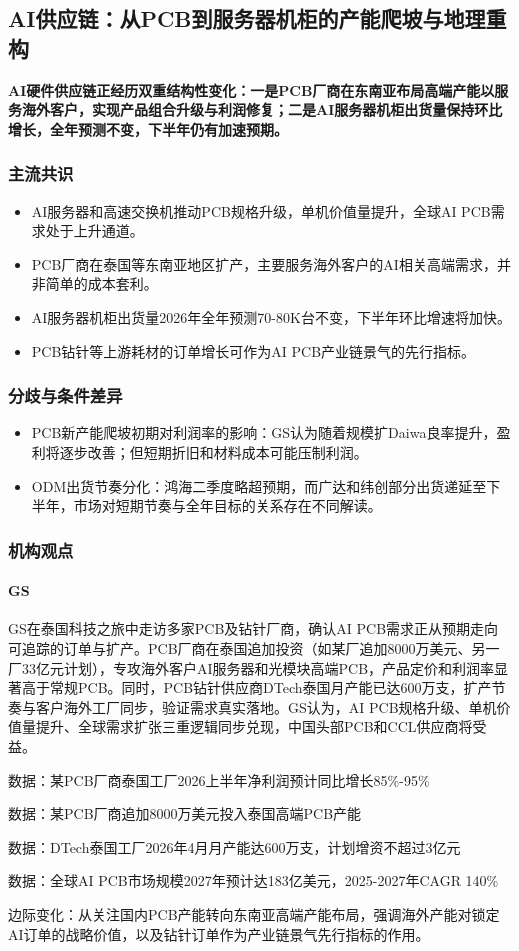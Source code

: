 \documentclass[11pt]{ctexart}
\begin{document}
\subsection{AI供应链：从PCB到服务器机柜的产能爬坡与地理重构}
\textbf{AI硬件供应链正经历双重结构性变化：一是PCB厂商在东南亚布局高端产能以服务海外客户，实现产品组合升级与利润修复；二是AI服务器机柜出货量保持环比增长，全年预测不变，下半年仍有加速预期。}
\subsubsection*{主流共识}
\begin{itemize}
  \item AI服务器和高速交换机推动PCB规格升级，单机价值量提升，全球AI PCB需求处于上升通道。
  \item PCB厂商在泰国等东南亚地区扩产，主要服务海外客户的AI相关高端需求，并非简单的成本套利。
  \item AI服务器机柜出货量2026年全年预测70-80K台不变，下半年环比增速将加快。
  \item PCB钻针等上游耗材的订单增长可作为AI PCB产业链景气的先行指标。
\end{itemize}
\subsubsection*{分歧与条件差异}
\begin{itemize}
  \item PCB新产能爬坡初期对利润率的影响：GS认为随着规模扩Daiwa良率提升，盈利将逐步改善；但短期折旧和材料成本可能压制利润。
  \item ODM出货节奏分化：鸿海二季度略超预期，而广达和纬创部分出货递延至下半年，市场对短期节奏与全年目标的关系存在不同解读。
\end{itemize}
\subsubsection*{机构观点}
\paragraph{GS} GS在泰国科技之旅中走访多家PCB及钻针厂商，确认AI PCB需求正从预期走向可追踪的订单与扩产。PCB厂商在泰国追加投资（如某厂追加8000万美元、另一厂33亿元计划），专攻海外客户AI服务器和光模块高端PCB，产品定价和利润率显著高于常规PCB。同时，PCB钻针供应商DTech泰国月产能已达600万支，扩产节奏与客户海外工厂同步，验证需求真实落地。GS认为，AI PCB规格升级、单机价值量提升、全球需求扩张三重逻辑同步兑现，中国头部PCB和CCL供应商将受益。
{\small\color{refgray}数据：某PCB厂商泰国工厂2026上半年净利润预计同比增长85\%-95\%\par}
{\small\color{refgray}数据：某PCB厂商追加8000万美元投入泰国高端PCB产能\par}
{\small\color{refgray}数据：DTech泰国工厂2026年4月月产能达600万支，计划增资不超过3亿元\par}
{\small\color{refgray}数据：全球AI PCB市场规模2027年预计达183亿美元，2025-2027年CAGR 140\%\par}
{\small\color{refgray}边际变化：从关注国内PCB产能转向东南亚高端产能布局，强调海外产能对锁定AI订单的战略价值，以及钻针订单作为产业链景气先行指标的作用。\par}
\end{document}
